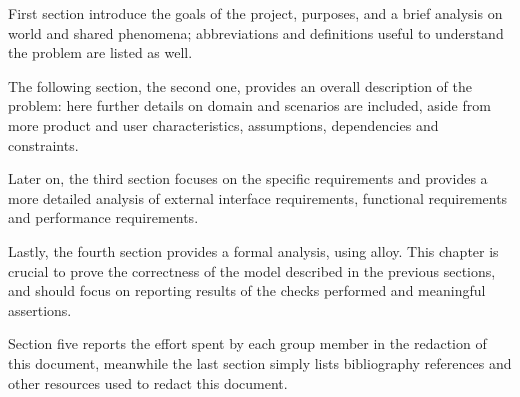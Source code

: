 First section introduce the goals of the project, purposes, and a brief analysis on world and shared phenomena;
abbreviations and definitions useful to understand the problem are listed as well.

The following section, the second one, provides an overall description of the problem: here further
details on domain and scenarios are included, aside from more product and user characteristics, assumptions,
dependencies and constraints.

Later on, the third section focuses on the specific requirements and provides a more detailed analysis of external
interface requirements, functional requirements and performance requirements.

Lastly, the fourth section provides a formal analysis, using alloy.
This chapter is crucial to prove the correctness of the model described in the previous sections, and should focus on
reporting results of the checks performed and meaningful assertions.

Section five reports the effort spent by each group member in the redaction of this document, meanwhile the last
section simply lists bibliography references and other resources used to redact this document.
